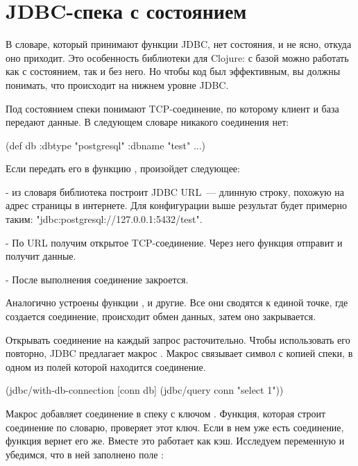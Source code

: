 \section{JDBC-спека с состоянием}

В словаре, который принимают функции JDBC, нет состояния, и не ясно, откуда оно приходит. Это особенность библиотеки для Clojure: с базой можно работать как с состоянием, так и без него. Но чтобы код был эффективным, вы должны понимать, что происходит на нижнем уровне JDBC.

Под состоянием спеки понимают TCP-соединение, по которому клиент и база передают данные. В следующем словаре никакого соединения нет:

\begin{english}
  \begin{clojure}
(def db {:dbtype "postgresql"
         :dbname "test"
         ...})
  \end{clojure}
\end{english}

Если передать его в функцию , произойдет следующее:

- из словаря библиотека построит JDBC URL~--- длинную строку, похожую на адрес страницы в интернете. Для конфигурации выше результат будет примерно таким: "jdbc:postgresql://127.0.0.1:5432/test".

- По URL получим открытое TCP-соединение. Через него функция  отправит и получит данные.

- После выполнения  соединение закроется.

Аналогично устроены функции ,  и другие. Все они сводятся к единой точке, где создается соединение, происходит обмен данных, затем оно закрывается.

Открывать соединение на каждый запрос расточительно. Чтобы использовать его повторно, JDBC предлагает макрос . Макрос связывает символ с копией спеки, в одном из полей которой находится соединение.

\begin{english}
  \begin{clojure}
(jdbc/with-db-connection [conn db]
  (jdbc/query conn "select 1"))
  \end{clojure}
\end{english}

Макрос добавляет соединение в спеку с ключом . Функция, которая строит соединение по словарю, проверяет этот ключ. Если в нем уже есть соединение, функция вернет его же. Вместе это работает как кэш. Исследуем переменную  и убедимся, что в ней заполнено поле :

